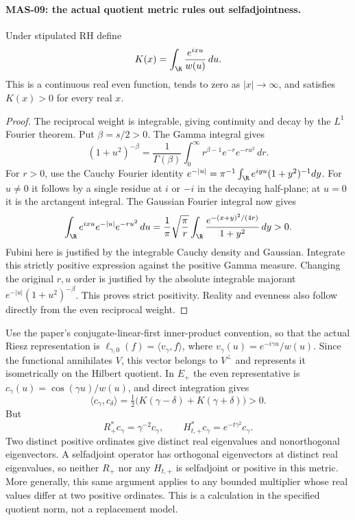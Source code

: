 \paragraph{MAS-09: the actual quotient metric rules out selfadjointness.}
Under stipulated RH define
\[
 K(x)=\int_\R\frac{e^{ixu}}{w(u)}\,du.
\]
This is a continuous real even function, tends to zero as $|x|\to\infty$, and satisfies $K(x)>0$ for every real $x$.
\begin{proof}
The reciprocal weight is integrable, giving continuity and decay by the $L^1$ Fourier theorem. Put $\beta=s/2>0$. The Gamma integral gives
\[
 (1+u^2)^{-\beta}
 =\frac1{\Gamma(\beta)}\int_0^\infty r^{\beta-1}e^{-r}e^{-ru^2}\,dr.
\]
For $r>0$, use the Cauchy Fourier identity
$e^{-|u|}=\pi^{-1}\int_\R e^{iyu}(1+y^2)^{-1}dy$. For $u\ne0$ it follows by a single residue at $i$ or $-i$ in the decaying half-plane; at $u=0$ it is the arctangent integral. The Gaussian Fourier integral now gives
\[
 \int_\R e^{ixu}e^{-|u|}e^{-ru^2}\,du
 =\frac1\pi\sqrt{\frac\pi r}
   \int_\R\frac{e^{-(x+y)^2/(4r)}}{1+y^2}\,dy>0.
\]
Fubini here is justified by the integrable Cauchy density and Gaussian. Integrate this strictly positive expression against the positive Gamma measure. Changing the original $r,u$ order is justified by the absolute integrable majorant
$e^{-|u|}(1+u^2)^{-\beta}$. This proves strict positivity. Reality and evenness also follow directly from the even reciprocal weight.
\end{proof}

Use the paper's conjugate-linear-first inner-product convention, so that the actual Riesz representation is $\ell_{\gamma,0}(f)=\langle v_\gamma,f\rangle$, where
$v_\gamma(u)=e^{-i\gamma u}/w(u)$. Since the functional annihilates $V$, this vector belongs to $V^\perp$ and represents it isometrically on the Hilbert quotient. In $E_+$ the even representative is
$c_\gamma(u)=\cos(\gamma u)/w(u)$, and direct integration gives
\begin{equation}\label{eq:MasActualCorrelation}
 \langle c_\gamma,c_\delta\rangle
 =\tfrac12\bigl(K(\gamma-\delta)+K(\gamma+\delta)\bigr)>0.
\end{equation}
But
\[
 R_+^*c_\gamma=\gamma^{-2}c_\gamma,\qquad
 H_{t,+}^*c_\gamma=e^{-t\gamma^2}c_\gamma.
\]
Two distinct positive ordinates give distinct real eigenvalues and nonorthogonal eigenvectors. A selfadjoint operator has orthogonal eigenvectors at distinct real eigenvalues, so neither $R_+$ nor any $H_{t,+}$ is selfadjoint or positive in this metric. More generally, this same argument applies to any bounded multiplier whose real values differ at two positive ordinates. This is a calculation in the specified quotient norm, not a replacement model.

